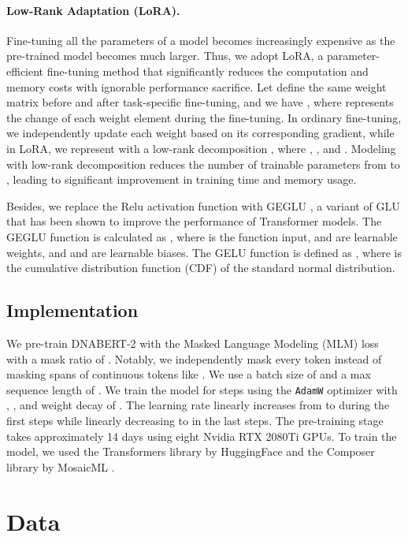 \documentclass{article}
\begin{document}
\paragraph{Low-Rank Adaptation (LoRA). } Fine-tuning all the parameters of a model becomes increasingly expensive as the pre-trained model becomes much larger. Thus, we adopt LoRA, a parameter-efficient fine-tuning method that significantly reduces the computation and memory costs with ignorable performance sacrifice. Let  define the same weight matrix before and after task-specific fine-tuning, and we have , where  represents the change of each weight element during the fine-tuning. In ordinary fine-tuning, we independently update each weight based on its corresponding gradient, while in LoRA, we represent  with a low-rank decomposition , where , , and . Modeling  with low-rank decomposition reduces the number of trainable parameters from  to , leading to significant improvement in training time and memory usage.


Besides, we replace the Relu activation function with GEGLU \citep{geglu}, a variant of GLU \citep{glu} that has been shown to improve the performance of Transformer models. The GEGLU function is calculated as , where  is the function input,  and  are learnable weights, and  and  are learnable biases. The GELU function is defined as , where  is the cumulative distribution function (CDF) of the standard normal distribution.



\subsection{Implementation}
\label{subsec:model_implementation}
We pre-train DNABERT-2 with the Masked Language Modeling (MLM) loss with a mask ratio of . 
Notably, we independently mask every token instead of masking spans of continuous tokens like \citet{dnabert}. We use a batch size of  and a max sequence length of . We train the model for  steps using the \texttt{AdamW} \citep{adamw} optimizer with , ,  and weight decay of . The learning rate linearly increases from  to  during the first   steps while linearly decreasing to  in the last   steps. The pre-training stage takes approximately 14 days using eight Nvidia RTX 2080Ti GPUs. To train the model, we used the Transformers library by HuggingFace \citep{huggingface-transformers} and the Composer library by MosaicML \citep{mosaicml2022composer}.



\section{Data}
\label{sec:data}
\end{document}

